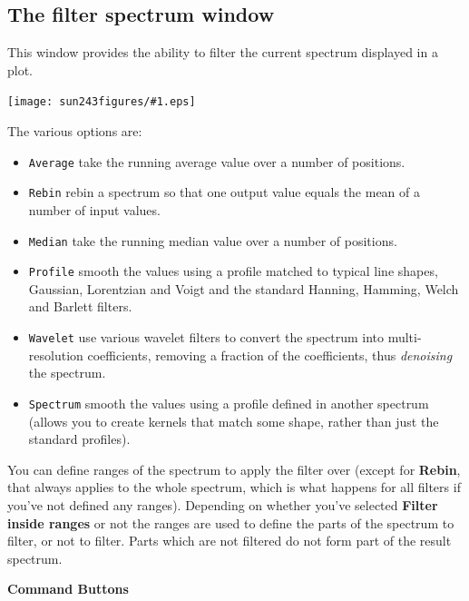 \documentclass[twoside,11pt]{article}
\newcommand{\htmladdimg}[1]{}
\newcommand{\latexhtml}[2]{#1}
\renewcommand{\_}{\texttt{\symbol{95}}}
\newcommand{\mainfigure}[1]
{\begin{center}
 \latexhtml{\texttt{[image: sun243\_figures/\#1.eps]}}{\htmladdimg{#1.gif}}
 \end{center}
}
\newcommand{\labelitem}[1]{\textbf{#1}}
\newcommand{\hitext}[1]{\texttt{#1}}
\newcommand{\subheading}[1]{\textbf{\large{#1}}}
\begin{document}
\newpage
\subsection{The filter spectrum window}

This window provides the ability to filter the current spectrum
displayed in a plot.

\mainfigure{filterwindow}

The various options are:
\begin{itemize}
  \item \hitext{Average} take the running average value over a
        number of positions.
  \item \hitext{Rebin} rebin a spectrum so that one output value
        equals the mean of a number of input values.
  \item \hitext{Median} take the running median value over a
        number of positions.
  \item \hitext{Profile} smooth the values using a profile matched
        to typical line shapes, Gaussian, Lorentzian and Voigt and
        the standard Hanning, Hamming, Welch and Barlett filters.
  \item \hitext{Wavelet} use various wavelet filters to convert the
        spectrum into multi-resolution coefficients, removing a
        fraction of the coefficients, thus \textit{denoising} the
        spectrum.
  \item \hitext{Spectrum} smooth the values using a profile
        defined in another spectrum (allows you to create kernels
        that match some shape, rather than just the standard profiles).
\end{itemize}

You can define ranges of the spectrum to apply the filter over (except for
\labelitem{Rebin}, that always applies to the whole spectrum, which is what
happens for all filters if you've not defined any ranges).  Depending on
whether you've selected \labelitem{Filter inside ranges} or not the ranges are
used to define the parts of the spectrum to filter, or not to filter. Parts
which are not filtered do not form part of the result spectrum.

\subheading{Command Buttons}
\end{document}

